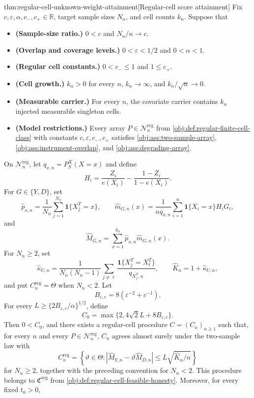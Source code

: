 \begin{theoremv}{thm:regular-cell-unknown-weight-attainment}[Regular-cell score attainment]
Fix \(c,\varepsilon,\alpha,c_-,c_+\in\mathbb R\), target sample sizes \(N_n\), and cell counts \(k_n\).  Suppose that
\begin{itemize}
\item \textbf{(Sample-size ratio.)} \(0<c\) and \(N_n/n\to c\).
\item \textbf{(Overlap and coverage levels.)} \(0<\varepsilon<1/2\) and \(0<\alpha<1\).
\item \textbf{(Regular cell constants.)} \(0<c_-\le 1\) and \(1\le c_+\).
\item \textbf{(Cell growth.)} \(k_n>0\) for every \(n\), \(k_n\to\infty\), and \(k_n/\sqrt n\to0\).
\item \textbf{(Measurable carrier.)} For every \(n\), the covariate carrier contains \(k_n\) injected measurable singleton cells.
\item \textbf{(Model restrictions.)} Every array \(P\in\mathcal N_n^{\mathrm{reg}}\) from \cref{obj:def:regular-finite-cell-class} with constants \(c,\varepsilon,c_-,c_+\) satisfies \cref{obj:ass:two-sample-array}, \cref{obj:ass:instrument-overlap}, and \cref{obj:ass:degrading-array}.
\end{itemize}
On \(\mathcal N_n^{\mathrm{reg}}\), let \(q_{x,n}=P_S^X(X=x)\) and define
\[
H_i=\frac{Z_i}{e(X_i)}-\frac{1-Z_i}{1-e(X_i)}.
\]
For \(G\in\{Y,D\}\), set
\[
\widehat p_{x,n}=\frac1{N_n}\sum_{j=1}^{N_n}\mathbf 1\{X_j^T=x\},
\qquad
\widehat m_{G,n}(x)=\frac1{nq_{x,n}}\sum_{i=1}^n
\mathbf 1\{X_i=x\}H_iG_i,
\]
and
\[
\widehat M_{G,n}=\sum_{x=1}^{k_n}\widehat p_{x,n}\widehat m_{G,n}(x).
\]
For \(N_n\ge2\), set
\[
\widehat\kappa_{U,n}
=
\frac1{N_n(N_n-1)}\sum_{j\ne\ell}
\frac{\mathbf 1\{X_j^T=X_\ell^T\}}{q_{X_j^T,n}},
\qquad
\widehat K_n=1+\widehat\kappa_{U,n},
\]
and put \(C_n^{\mathrm{reg}}=\Theta\) when \(N_n<2\).  Let
\[
B_{\varepsilon,c}=8(\varepsilon^{-2}+c^{-1}).
\]
For every \(L\ge\{2B_{\varepsilon,c}/\alpha\}^{1/2}\), define
\[
C_{0}=\max\{2,4\sqrt2L+8B_{\varepsilon,c}\}.
\]
Then \(0<C_0\), and there exists a regular-cell procedure \(C=(C_n)_{n\ge1}\) such that, for every \(n\) and every \(P\in\mathcal N_n^{\mathrm{reg}}\), \(C_n\) agrees almost surely under the two-sample law with
\[
C_n^{\mathrm{reg}}
=
\left\{\vartheta\in\Theta:
|\widehat M_{Y,n}-\vartheta\widehat M_{D,n}|
\le L\sqrt{\widehat K_n/n}\right\}
\]
for \(N_n\ge2\), together with the preceding convention for \(N_n<2\).  This procedure belongs to \(\mathfrak C^{\mathrm{reg}}\) from \cref{obj:def:regular-cell-feasible-honesty}.  Moreover, for every fixed \(t_0>0\),

\end{theoremv}
